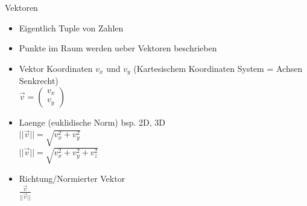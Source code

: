 \documentclass[10pt,aspectratio=169]{beamer}
\begin{document}
  \begin{frame}{Vektoren}
    \begin{minipage}{0.65\textwidth}
      \begin{itemize}
        \item Eigentlich Tuple von Zahlen
        \item Punkte im Raum werden ueber Vektoren beschrieben
        \item Vektor Koordinaten $v_x$ und $v_y$ (Kartesischem Koordinaten System = Achsen Senkrecht)\\\vspace{0.2cm} 
        \hspace{0.3cm}$\vec{v} = \begin{pmatrix} v_x\\ v_y\end{pmatrix}$
        \vspace{0.2cm}
        \item Laenge (euklidische Norm) bsp. 2D, 3D\\
        \hspace{0.3cm}$||\vec{v}|| =  \sqrt{v_x^2 + v_y^2}$\\
        \hspace{0.3cm}$||\vec{v}|| =  \sqrt{v_x^2 + v_y^2 + v_z^2}$
        \vspace{0.2cm}
        \item Richtung/Normierter Vektor\\
        \hspace{0.25cm}\Large$\frac{\vec{v}}{||\vec{v}||}$
      \end{itemize}  
    \end{minipage}
    \begin{minipage}[c]{0.3\textwidth}
    \end{minipage}
  \end{frame}
\end{document}
